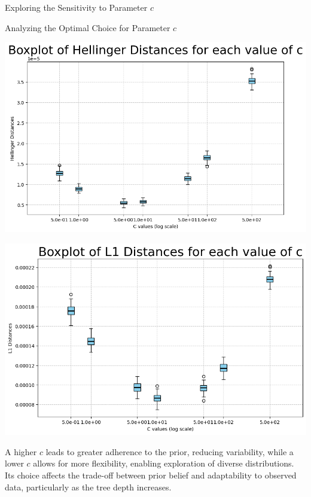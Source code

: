 \documentclass{beamer}
\begin{document}
\begin{frame}{Exploring the Sensitivity to Parameter \(c\)}
\begin{figure}
\begin{minipage}{0.32\textwidth}
        \end{minipage}
    \end{figure}
    \caption{\(Beta(2,2)\)}
\end{frame}


\begin{frame}{Analyzing the Optimal Choice for Parameter \(c\)}
    \centering
    \begin{minipage}{0.45\textwidth}
        \centering
        \includegraphics[width=\textwidth]{sorriso.jpeg}
    \end{minipage}
    \hfill
    \begin{minipage}{0.45\textwidth}
        \centering
        \includegraphics[width=\textwidth]{sorriso2.jpg}
    \end{minipage}
    
    \bigskip
    \bigskip
    A higher \(c\) leads to greater adherence to the prior, reducing variability, while a lower \(c\) allows for more flexibility, enabling exploration of diverse distributions. Its choice affects the trade-off between prior belief and adaptability to observed data, particularly as the tree depth increases.
    
\end{frame}
\end{document}
